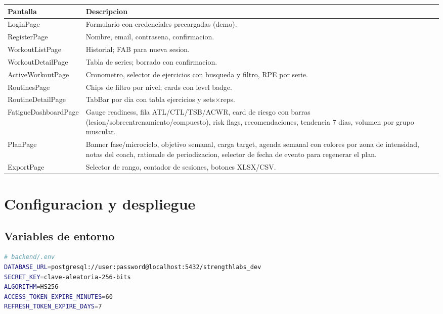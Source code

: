 \documentclass[12pt, a4paper]{article}
\begin{document}
\begin{longtable}{>{\ttfamily}p{5.2cm} p{8.8cm}}
  \toprule
  Pantalla & Descripcion \\
  \midrule
  \endhead
  LoginPage              & Formulario con credenciales precargadas (demo). \\
  RegisterPage           & Nombre, email, contrasena, confirmacion. \\
  WorkoutListPage        & Historial; FAB para nueva sesion. \\
  WorkoutDetailPage      & Tabla de series; borrado con confirmacion. \\
  ActiveWorkoutPage      & Cronometro, selector de ejercicios con busqueda y filtro, RPE por serie. \\
  RoutinesPage           & Chips de filtro por nivel; cards con level badge. \\
  RoutineDetailPage      & TabBar por dia con tabla ejercicios y sets$\times$reps. \\
  FatigueDashboardPage   & Gauge readiness, fila ATL/CTL/TSB/ACWR, card de riesgo
                           con barras (lesion/sobreentrenamiento/compuesto),
                           risk flags, recomendaciones, tendencia 7 dias,
                           volumen por grupo muscular. \\
  PlanPage               & Banner fase/microciclo, objetivo semanal, carga target,
                           agenda semanal con colores por zona de intensidad,
                           notas del coach, rationale de periodizacion,
                           selector de fecha de evento para regenerar el plan. \\
  ExportPage             & Selector de rango, contador de sesiones, botones XLSX/CSV. \\
  \bottomrule
\end{longtable}

\section{Configuracion y despliegue}

\subsection{Variables de entorno}

\begin{lstlisting}[language=bash]
# backend/.env
DATABASE_URL=postgresql://user:password@localhost:5432/strengthlabs_dev
SECRET_KEY=clave-aleatoria-256-bits
ALGORITHM=HS256
ACCESS_TOKEN_EXPIRE_MINUTES=60
REFRESH_TOKEN_EXPIRE_DAYS=7
\end{lstlisting}
\end{document}
